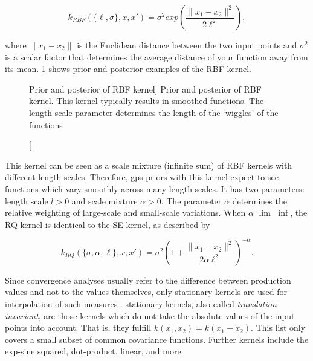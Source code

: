 \begin{description}
	\begin{equation}
	\label{eq:RBF_kernel}
	k_{RBF}(\{\ell, \sigma\}, x, x') = \sigma^2 exp\left(\frac{\lVert x_1 - x_2 \lVert ^2}{2\ell^2}\right),
	\end{equation}
	
	where $\lVert x_1 - x_2 \lVert$ is the Euclidean distance between the two input points and $\sigma^2$ is a scalar factor that determines the average distance of your function away from its mean.
	\cref{fig:RBF_prior_posterior} shows prior and posterior examples of the RBF kernel.
	
	\begin{figure}[t]
		\centering
		\hfill %
		\caption
		[Prior and posterior of RBF kernel]
		{Prior and posterior of RBF kernel.
			This kernel typically results in smoothed functions.
			The length scale parameter determines the length of the \enquote*{wiggles} of the functions}
		\label{fig:RBF_prior_posterior}
	\end{figure}
	
	\item[Rational quadratic kernel]
	This kernel can be seen as a scale mixture (infinite sum) of RBF kernels with different length scales.
	Therefore, \acp{gp} priors with this kernel expect to see functions which vary smoothly across many length scales.
	It has two parameters: length scale $l > 0$ and scale mixture $\alpha > 0$.
	The parameter $\alpha$ determines the relative weighting of large-scale and small-scale variations.
	When $\alpha$ $\lim$ $\inf$, the RQ kernel is identical to the SE kernel, as described by
	
	\begin{equation}
		\label{eq:RQ_kernel}
		k_{RQ}(\{\sigma, \alpha, \ell\}, x, x') = \sigma^2 \left( 1 + \frac{\lVert x_1 - x_2 \lVert ^2}{2\alpha \ell^2} \right)^{-\alpha}.
	\end{equation}
\end{description}

Since convergence analyses usually refer to the difference between production values and not to the values themselves, only stationary kernels are used for interpolation of such measures .
stationary kernels, also called \textit{translation invariant}, are those kernels which do not take the absolute values of the input points into account.
That is, they fulfill $k(x_1, x_2) = k(x_1 - x_2)$.
This list only covers a small subset of common covariance functions.
Further kernels include the exp-sine squared, dot-product, linear, and more.

